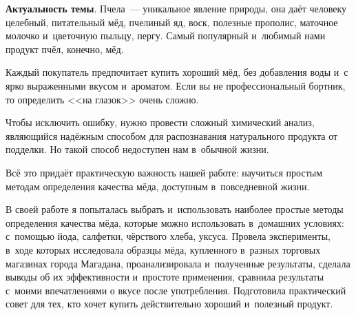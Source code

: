 \textbf{Актуальность темы}. Пчела~--- уникальное явление природы, она даёт человеку целебный, питательный мёд, пчелиный яд, воск, полезные прополис, маточное молочко и~цветочную пыльцу, пергу. Самый популярный и~любимый нами продукт пчёл, конечно, мёд.

Каждый покупатель предпочитает купить хороший мёд, без добавления воды и~с ярко выраженными вкусом и~ароматом. Если вы не профессиональный бортник, то определить <<на глазок>> очень сложно.

Чтобы исключить ошибку, нужно провести сложный химический анализ, являющийся надёжным способом для распознавания натурального продукта от подделки. Но такой способ недоступен нам в~обычной жизни.

Всё это придаёт практическую важность нашей работе: научиться простым методам определения качества мёда, доступным в~повседневной жизни.

В своей работе я попыталась выбрать и~использовать наиболее простые методы определения качества мёда, которые можно использовать в~домашних условиях: с~помощью йода, салфетки, чёрствого хлеба, уксуса. Провела эксперименты, в~ходе которых исследовала образцы мёда, купленного в~разных торговых магазинах города Магадана, проанализировала и~полученные результаты, сделала выводы об их эффективности и~простоте применения, сравнила результаты с~моими впечатлениями о вкусе после употребления. Подготовила практический совет для тех, кто хочет купить действительно хороший и~полезный продукт.
